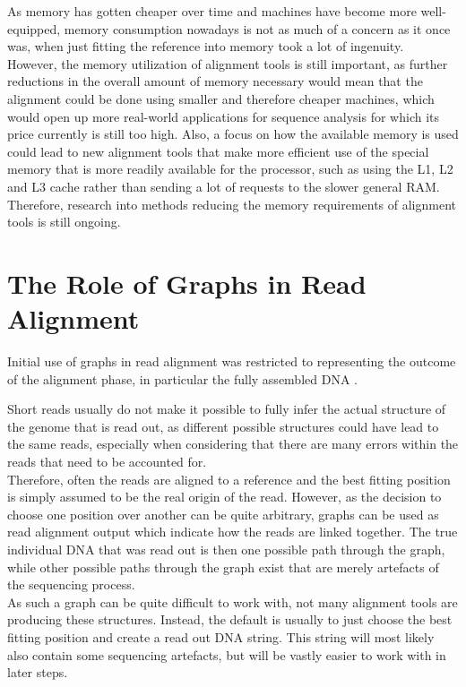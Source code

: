 \documentclass[a4paper,12pt,twoside,BCOR=10mm]{scrbook}
\begin{document}
As memory has gotten cheaper over time and machines have become more 
well-equipped, memory consumption nowadays is not as much of a concern 
as it once was, when just fitting the reference into memory 
took a lot of ingenuity. \\
However, the memory utilization of alignment tools is still important, 
as further reductions in the overall amount of memory necessary would 
mean that the alignment could be done using smaller and therefore cheaper 
machines, which would open up more real-world applications for sequence analysis 
for which its price currently is still too high.
Also, a focus on how the available memory is used could lead to new alignment 
tools that make more efficient use of the special memory that is more readily available 
for the processor, such as using the L1, L2 and L3 cache rather than sending a lot of 
requests to the slower general RAM. \\
Therefore, research into methods reducing the memory requirements of alignment tools 
is still ongoing.

\section{The Role of Graphs in Read Alignment}

Initial use of graphs in read alignment was restricted to representing 
the outcome of the alignment phase, in particular the fully assembled DNA \citep{Myers2005}.

Short reads usually do not make it possible to fully infer the actual structure of the genome that is read out, 
as different possible structures could have lead to the same reads, especially when considering that 
there are many errors within the reads that need to be accounted for. \\
Therefore, often the reads are aligned to a reference and the best fitting position is simply 
assumed to be the real origin of the read. However, as the decision to choose one position over 
another can be quite arbitrary, graphs can be used as read alignment output which indicate how the reads 
are linked together. The true individual DNA that was read out is then one possible path through the graph, 
while other possible paths through the graph exist that are merely artefacts of the sequencing process. \\
As such a graph can be quite difficult to work with, not many alignment tools are producing these 
structures. Instead, the default is usually to just choose the best fitting position and 
create a read out DNA string. This string will most likely also contain some sequencing artefacts, 
but will be vastly easier to work with in later steps.
\end{document}
